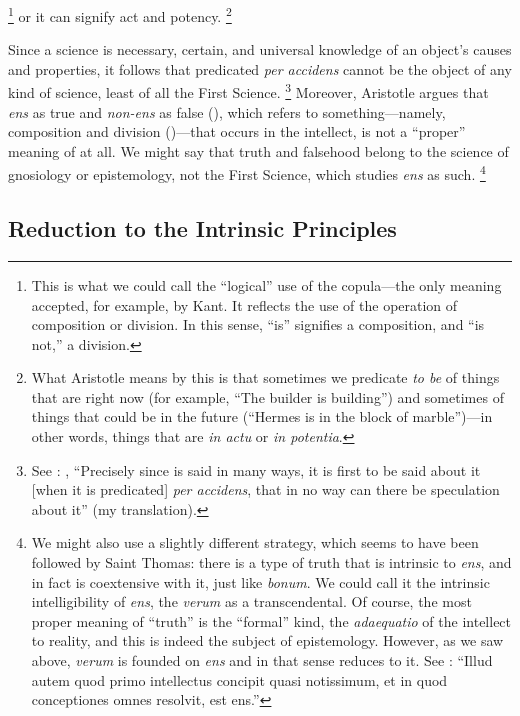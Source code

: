 %
\footnote{This is what we could call the ``logical'' use of the copula---the only meaning accepted, for example, by Kant. It reflects the use of the operation of composition or division. In this sense, ``is'' signifies a composition, and ``is not,'' a division.} or it can signify act and potency.%
%
\footnote{What Aristotle means by this is that sometimes we predicate \emph{to be} of things that are right now (for example, ``The builder is building'') and sometimes of things that could be in the future (``Hermes is in the block of marble'')---in other words, things that are \emph{in actu} or \emph{in potentia}.}

Since a science is necessary, certain, and universal knowledge of an object's causes and properties, it follows that  predicated \emph{per accidens} cannot be the object of any kind of science, least of all the First Science.%
%
\footnote{See \cite[,~2, 1026b1-3]{aristotle:metaphysics}: , ``Precisely since  is said in many ways, it is first to be said about it [when it is predicated] \emph{per accidens}, that in no way can there be speculation about it'' (my translation).}
%
Moreover, Aristotle argues that \emph{ens} as true and \emph{non-ens} as false (), which refers to something---namely, composition and division ()---that occurs in the intellect, is not a ``proper'' meaning of  at all. We might say that truth and falsehood belong to the science of gnosiology or epistemology, not the First Science, which studies \emph{ens} as such.%
%
\footnote{We might also use a slightly different strategy, which seems to have been followed by Saint Thomas: there is a type of truth that is intrinsic to \emph{ens}, and in fact is coextensive with it, just like \emph{bonum}. We could call it the intrinsic intelligibility of \emph{ens}, the \emph{verum} as a transcendental. Of course, the most proper meaning of ``truth'' is the ``formal'' kind, the \emph{adaequatio} of the intellect to reality, and this is indeed the subject of epistemology. However, as we saw above, \emph{verum} is founded on \emph{ens} and in that sense reduces to it. See \cite[q.~1, a.~1, co.:]{st:deveritate}: ``Illud autem quod primo intellectus concipit quasi notissimum, et in quod conceptiones omnes resolvit, est ens.''}

\subsection{Reduction to the Intrinsic Principles}

